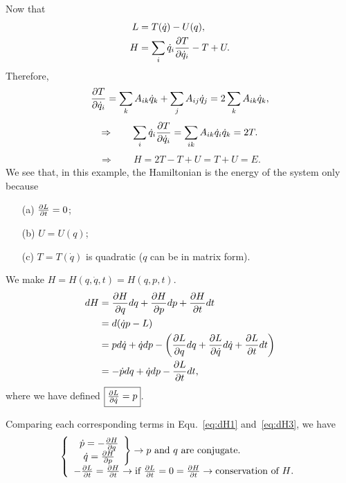 Now that 
\begin{align}
L &= T(\dot{q})-U(q),\\
H&= \sum_i \dot{q}_i \frac{\partial {T}}{\partial {\dot{q}_i}}-T+U.
\end{align}
Therefore, 
\begin{align}
\frac{\partial {T}}{\partial {\dot{q}_i}}= \sum_k A_{ik} \dot{q}_k+\sum_j A_{ij} \dot{q}_j=2\sum_k A_{ik}\dot{q}_k,
\end{align}
\begin{align}
\Rightarrow \qquad \sum_i \dot{q}_i \frac{\partial {T}}{\partial {\dot{q}_i}}= \sum_{ik} A_{ik}\dot{q}_i\dot{q}_k= 2T. 
\end{align}
\begin{align}
\Rightarrow \qquad H=2T-T+U= T+U=E.
\end{align}
We see that, in this example, the Hamiltonian is the energy of the system only because
\begin{itemize}
\item[(a) ] $ \frac{\partial {L}}{\partial t}=0 $;
\item[(b) ] $ U=U(q) $;
\item[(c) ] $ T=T(\dot{q}) $ is quadratic ($q$ can be in matrix form).
\end{itemize}

We make $ H=H(q,\dot{q},t) =H(q,p,t)$.
\begin{align}
dH &= \frac{\partial {H}}{\partial {q}}dq+\frac{\partial {H}}{\partial {p}} dp+ \frac{\partial {H}}{\partial t}dt \label{eq:dH1}\\
&= d(\dot{q}p-L)\\
&= pd\dot{q}+ \dot{q}dp - \left( \frac{\partial {L}}{\partial {q}}dq + \frac{\partial {L}}{\partial {\dot{q}}}d\dot{q}+ \frac{\partial {L}}{\partial t}dt \right)\\
&= -\dot{p}dq + \dot{q}dp - \frac{\partial {L}}{\partial t}dt,\label{eq:dH3}
\end{align}
where we have defined $ \fbox{$\frac{\partial {L}}{\partial {\dot{q}}}=p$} $.

Comparing each corresponding terms in Equ.~\ref{eq:dH1} and~\ref{eq:dH3},  we have
\begin{equation}
\left\{ \begin{array}{l}
\left. \begin{array}{c}
\dot{p}= -\frac{\partial {H}}{\partial {q}}\\
\dot{q}=\frac{\partial {H}}{\partial {p}}
\end{array}\right\}\rightarrow \textrm{$p$ and $q$ are conjugate.} \\
-\frac{\partial {L}}{\partial t}= \frac{\partial {H}}{\partial t}\rightarrow \textrm{if }\frac{\partial {L}}{\partial t}=0=\frac{\partial {H}}{\partial t}\rightarrow \textrm{conservation of $H$.}
\end{array} \right.
\end{equation}

